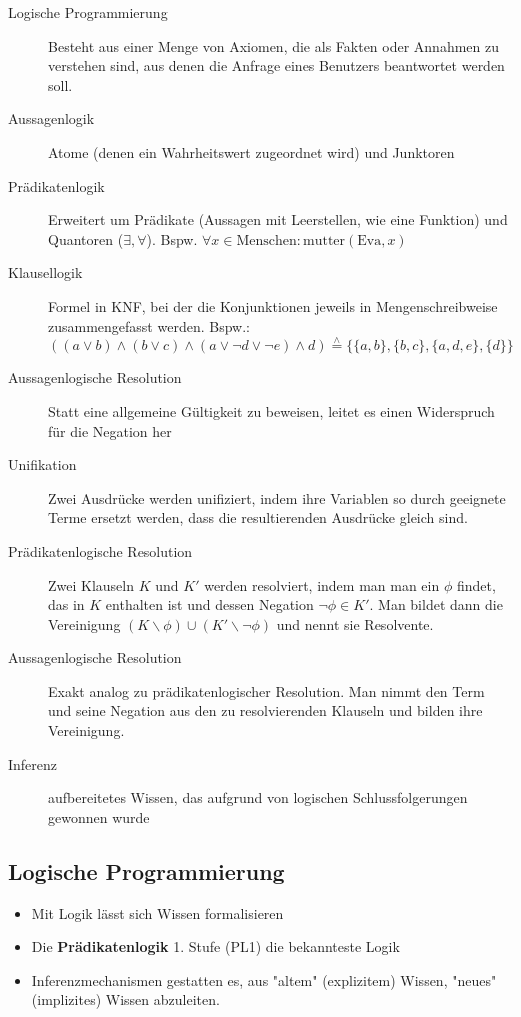 \documentclass[runningheads,deutsch]{llncs}
\newcommand{\estimates}{\overset{\scriptscriptstyle\wedge}{=}}
\begin{document}
\begin{description}
    \item[Logische Programmierung] Besteht aus einer Menge von Axiomen, die als Fakten oder Annahmen zu verstehen sind, aus denen die Anfrage eines Benutzers beantwortet werden soll. 
    \item[Aussagenlogik] Atome (denen ein Wahrheitswert zugeordnet wird) und Junktoren
    \item[Prädikatenlogik] Erweitert um Prädikate (Aussagen mit Leerstellen, wie eine Funktion) und Quantoren ($\exists, \forall$). Bspw. $\forall x \in \text{Menschen}: \text{mutter}(\text{Eva}, x)$
    \item[Klausellogik] Formel in KNF, bei der die Konjunktionen jeweils in Mengenschreibweise zusammengefasst werden. Bspw.: \\
    $((a \lor b) \land (b \lor c) \land (a \lor \lnot d \lor \lnot e) \land d) \estimates \{\{a,b\}, \{b, c\}, \{a, d, e\}, \{d\}\}$
    \item[Aussagenlogische Resolution] Statt eine allgemeine Gültigkeit zu beweisen, leitet es einen Widerspruch für die Negation her    
    \item[Unifikation] Zwei Ausdrücke werden unifiziert, indem ihre Variablen so durch geeignete Terme ersetzt werden, dass die resultierenden Ausdrücke gleich sind.
    \item[Prädikatenlogische Resolution] Zwei Klauseln $K$ und $K'$ werden resolviert, indem man man ein $\phi$ findet, das in $K$ enthalten ist und dessen Negation $\lnot\phi \in K'$. Man bildet dann die Vereinigung $(K \backslash \phi) \cup (K' \backslash \lnot\phi)$ und nennt sie Resolvente.
    \item[Aussagenlogische Resolution] Exakt analog zu prädikatenlogischer Resolution. Man nimmt den Term und seine Negation aus den zu resolvierenden Klauseln und bilden ihre Vereinigung.
    \item[Inferenz] aufbereitetes Wissen, das aufgrund von logischen Schlussfolgerungen gewonnen wurde
\end{description}

\subsection{Logische Programmierung}
\begin{itemize}
    \item Mit Logik lässt sich Wissen formalisieren
    \item Die \textbf{Prädikatenlogik} 1. Stufe (PL1) die bekannteste Logik
    \item Inferenzmechanismen gestatten es, aus "altem" (explizitem) Wissen, "neues" (implizites) Wissen abzuleiten.
\end{itemize}
\end{document}
